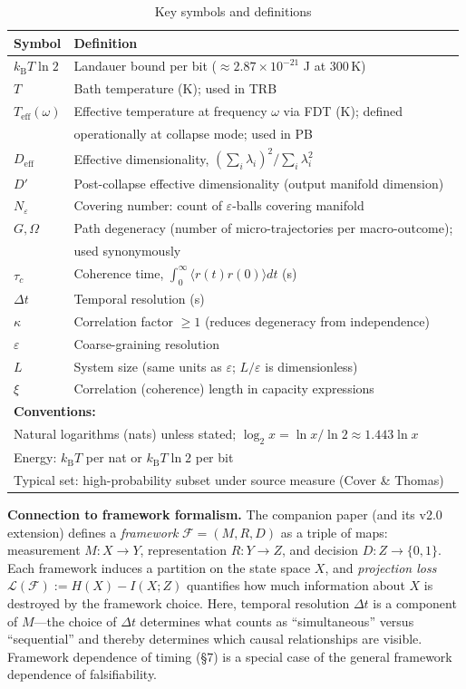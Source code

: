 \documentclass[12pt]{article}
\numberwithin{equation}{section}
\newcommand{\kB}{k_{\mathrm{B}}}
\newcommand{\Teff}{T_{\mathrm{eff}}}
\begin{document}
\begin{table}[h]
\centering
\caption{Key symbols and definitions}
\label{tab:notation}
\begin{tabular}{@{}ll@{}}
\toprule
Symbol & Definition \\
\midrule
$\kB T\ln 2$ & Landauer bound per bit ($\approx 2.87 \times 10^{-21}$ J at 300\,K) \\
$T$ & Bath temperature (K); used in TRB \\
$\Teff(\omega)$ & Effective temperature at frequency $\omega$ via FDT (K); defined \\
 & operationally at collapse mode; used in PB \\
$D_{\text{eff}}$ & Effective dimensionality, $(\sum_i \lambda_i)^2/\sum_i \lambda_i^2$ \\
$D'$ & Post-collapse effective dimensionality (output manifold dimension) \\
$N_\varepsilon$ & Covering number: count of $\varepsilon$-balls covering manifold \\
$G, \Omega$ & Path degeneracy (number of micro-trajectories per macro-outcome); \\
 & used synonymously \\
$\tau_c$ & Coherence time, $\int_0^\infty \langle r(t)r(0)\rangle dt$ (s) \\
$\Delta t$ & Temporal resolution (s) \\
$\kappa$ & Correlation factor $\ge 1$ (reduces degeneracy from independence) \\
$\varepsilon$ & Coarse-graining resolution \\
$L$ & System size (same units as $\varepsilon$; $L/\varepsilon$ is dimensionless) \\
$\xi$ & Correlation (coherence) length in capacity expressions \\
\midrule
\multicolumn{2}{l}{\textbf{Conventions:}} \\
\multicolumn{2}{l}{Natural logarithms (nats) unless stated; $\log_2 x = \ln x/\ln 2 \approx 1.443\ln x$} \\
\multicolumn{2}{l}{Energy: $\kB T$ per nat or $\kB T\ln 2$ per bit} \\
\multicolumn{2}{l}{Typical set: high-probability subset under source measure (Cover \& Thomas)} \\
\bottomrule
\end{tabular}
\end{table}

\textbf{Connection to framework formalism.} The companion paper \cite{todd2025biosystems} (and its v2.0 extension) defines a \emph{framework} $\mathcal{F} = (M, R, D)$ as a triple of maps: measurement $M: X \to Y$, representation $R: Y \to Z$, and decision $D: Z \to \{0,1\}$. Each framework induces a partition on the state space $X$, and \emph{projection loss} $\mathcal{L}(\mathcal{F}) := H(X) - I(X;Z)$ quantifies how much information about $X$ is destroyed by the framework choice. Here, temporal resolution $\Delta t$ is a component of $M$---the choice of $\Delta t$ determines what counts as ``simultaneous'' versus ``sequential'' and thereby determines which causal relationships are visible. Framework dependence of timing (\S7) is a special case of the general framework dependence of falsifiability.
\end{document}
